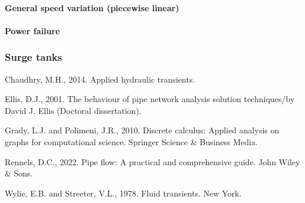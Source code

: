 \documentclass[12pt]{article}
\begin{document}
\paragraph{General speed variation (piecewise linear)}

\paragraph{Power failure}


\subsubsection{Surge tanks}


\begin{thebibliography}{9}
 Chaudhry, M.H., 2014. Applied hydraulic transients.

 Ellis, D.J., 2001. The behaviour of pipe network analysis solution techniques/by David J. Ellis (Doctoral dissertation).

 Grady, L.J. and Polimeni, J.R., 2010. Discrete calculus: Applied analysis on graphs for computational science. Springer Science \& Business Media.

 Rennels, D.C., 2022. Pipe flow: A practical and comprehensive guide. John Wiley \& Sons.

 Wylie, E.B. and Streeter, V.L., 1978. Fluid transients. New York.

\end{thebibliography}
\end{document}
